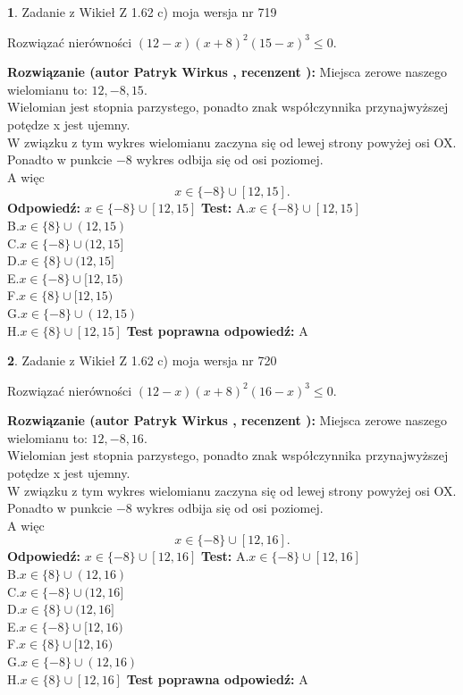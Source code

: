 \documentclass[12pt, a4paper]{article}
\theoremstyle{definition} %
\newtheorem{zad}{}
\newcommand{\zadStart}[1]{\begin{zad}#1\newline}
\newcommand{\zadStop}{\end{zad}}
\newcommand{\rozwStart}[2]{\noindent \textbf{Rozwiązanie (autor #1 , recenzent #2): }\newline}
\newcommand{\rozwStop}{\newline}
\newcommand{\odpStart}{\noindent \textbf{Odpowiedź:}\newline}
\newcommand{\odpStop}{\newline}
\newcommand{\testStart}{\noindent \textbf{Test:}\newline}
\newcommand{\testStop}{\newline}
\newcommand{\kluczStart}{\noindent \textbf{Test poprawna odpowiedź:}\newline}
\newcommand{\kluczStop}{\newline}
\begin{document}
\zadStart{Zadanie z Wikieł Z 1.62 c) moja wersja nr 719}

Rozwiązać nierówności $(12-x)(x+8)^{2}(15-x)^{3}\le0$.
\zadStop
\rozwStart{Patryk Wirkus}{}
Miejsca zerowe naszego wielomianu to: $12, -8, 15$.\\
Wielomian jest stopnia parzystego, ponadto znak współczynnika przy\linebreak najwyższej potędze x jest ujemny.\\ W związku z tym wykres wielomianu zaczyna się od lewej strony powyżej osi OX.\\
Ponadto w punkcie $-8$ wykres odbija się od osi poziomej.\\
A więc $$x \in \{-8\} \cup [12,15].$$
\rozwStop
\odpStart
$x \in \{-8\} \cup [12,15]$
\odpStop
\testStart
A.$x \in \{-8\} \cup [12,15]$\\
B.$x \in \{8\} \cup (12,15)$\\
C.$x \in \{-8\} \cup (12,15]$\\
D.$x \in \{8\} \cup (12,15]$\\
E.$x \in \{-8\} \cup [12,15)$\\
F.$x \in \{8\} \cup [12,15)$\\
G.$x \in \{-8\} \cup (12,15)$\\
H.$x \in \{8\} \cup [12,15]$
\testStop
\kluczStart
A
\kluczStop



\zadStart{Zadanie z Wikieł Z 1.62 c) moja wersja nr 720}

Rozwiązać nierówności $(12-x)(x+8)^{2}(16-x)^{3}\le0$.
\zadStop
\rozwStart{Patryk Wirkus}{}
Miejsca zerowe naszego wielomianu to: $12, -8, 16$.\\
Wielomian jest stopnia parzystego, ponadto znak współczynnika przy\linebreak najwyższej potędze x jest ujemny.\\ W związku z tym wykres wielomianu zaczyna się od lewej strony powyżej osi OX.\\
Ponadto w punkcie $-8$ wykres odbija się od osi poziomej.\\
A więc $$x \in \{-8\} \cup [12,16].$$
\rozwStop
\odpStart
$x \in \{-8\} \cup [12,16]$
\odpStop
\testStart
A.$x \in \{-8\} \cup [12,16]$\\
B.$x \in \{8\} \cup (12,16)$\\
C.$x \in \{-8\} \cup (12,16]$\\
D.$x \in \{8\} \cup (12,16]$\\
E.$x \in \{-8\} \cup [12,16)$\\
F.$x \in \{8\} \cup [12,16)$\\
G.$x \in \{-8\} \cup (12,16)$\\
H.$x \in \{8\} \cup [12,16]$
\testStop
\kluczStart
A
\kluczStop
\end{document}
